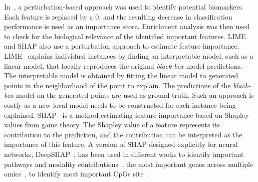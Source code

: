 \documentclass[../main.tex]{subfiles}
\begin{document}
	In~\cite{MOGONET}, a perturbation-based approach was used to identify potential biomarkers.
	Each feature is replaced by a 0, and the resulting decrease in classification performance is used as an importance score.
	Enrichment analysis was then used to check for the biological relevance of the identified important features.
	LIME and SHAP also use a perturbation approach to estimate feature importance.
	LIME~\cite{LIME} explains individual instances by finding an interpretable model, such as a linear model, that locally reproduces the original \textit{black-box} model predictions.
	The interpretable model is obtained by fitting the linear model to generated points in the neighborhood of the point to explain.
	The predictions of the \textit{black-box} model on the generated points are used as ground truth.
	Such an approach is costly as a new local model needs to be constructed for each instance being explained.
	SHAP~\cite{SHAP} is a method estimating feature importance based on Shapley values from game theory.
	The Shapley value of a feature represents its contribution to the prediction, and the contribution can be interpreted as the importance of this feature.
	A version of SHAP designed explicitly for neural networks, DeepSHAP~\cite{DeepSHAP}, has been used in different works to identify important pathways and modality contributions~\cite{Liu2024}, the most important genes across multiple omics~\cite{Withnell2021,customics}, to identify most important CpGs site~\cite{levyMethylNetAutomatedModular2020a}.
\end{document}
